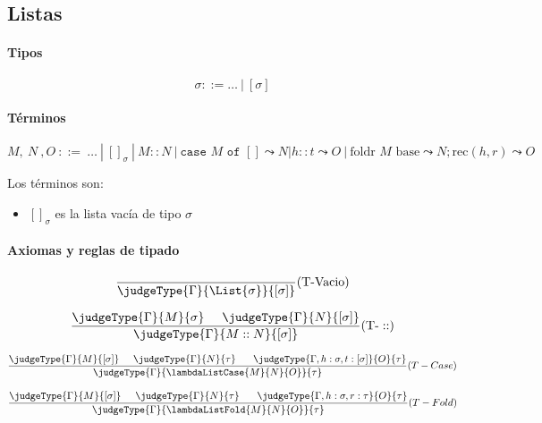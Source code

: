 \subsection{Listas}

\paragraph{Tipos}
\[\sigma::= \dots~|~[\sigma]\]

\paragraph{Términos}
\[M,~N~,O~::=~\dots~|~[]_{\sigma}~|~M::N~|~\texttt{case } M \texttt{ of } {[] \leadsto N | h::t \leadsto O}~|~\text{foldr } M \text{ base} \leadsto N; \text{rec}(h,r)\leadsto O\]

Los términos son:
\begin{itemize}
	\item \([]_{\sigma}\) es la lista vacía de tipo \(\sigma\)
\end{itemize}
\paragraph{Axiomas y reglas de tipado}
\begin{multicols}{2}
	\[\frac{}{\judgeType{\Gamma}{\List{\sigma}}{[\sigma]}}(\text{T-Vacio})\]
	
	\vspace*{5mm}
	\[\frac{\judgeType{\Gamma}{M}{\sigma}\hspace*{5mm}\judgeType{\Gamma}{N}{[\sigma]}}{\judgeType{\Gamma}{M::N}{[\sigma]}}(\text{T-}::)\]
	
	\vspace*{5mm}
	\[\frac{\judgeType{\Gamma}{M}{[\sigma]}\hspace*{5mm}\judgeType{\Gamma}{N}{\tau}~\hspace*{5mm}\judgeType{\Gamma,h:\sigma,t:[\sigma]}{O}{\tau}}{\judgeType{\Gamma}{\lambdaListCase{M}{N}{O}}{\tau}}(T-Case)\]
	
	\vspace*{5mm}
	\[\frac{\judgeType{\Gamma}{M}{[\sigma]}\hspace*{5mm}\judgeType{\Gamma}{N}{\tau}~\hspace*{5mm}\judgeType{\Gamma,h:\sigma,r:\tau}{O}{\tau}}{\judgeType{\Gamma}{\lambdaListFold{M}{N}{O}}{\tau}}(T-Fold)\]
	
\end{multicols}

